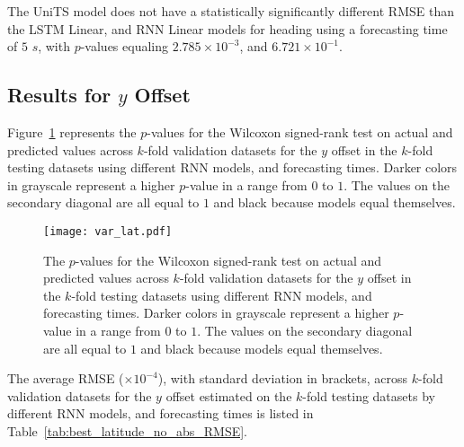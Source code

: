 The UniTS model does not have a statistically significantly different RMSE than the LSTM Linear, and RNN Linear models for heading using a forecasting time of $5$ $s$, with $p$-values equaling $2.785 \times 10^{-3}$, and $6.721 \times 10^{-1}$.

\subsection{Results for $y$ Offset}

Figure~\ref{fig:var_lat} represents the $p$-values for the Wilcoxon signed-rank test on actual and predicted values across $k$-fold validation datasets for the $y$ offset in the $k$-fold testing datasets using different RNN models, and forecasting times. Darker colors in grayscale represent a higher $p$-value in a range from $0$ to $1$. The values on the secondary diagonal are all equal to $1$ and black because models equal themselves.

\begin{figure}[!ht]
	\centering
	\texttt{[image: var\_lat.pdf]}
	\caption{The $p$-values for the Wilcoxon signed-rank test on actual and predicted values across $k$-fold validation datasets for the $y$ offset in the $k$-fold testing datasets using different RNN models, and forecasting times. Darker colors in grayscale represent a higher $p$-value in a range from $0$ to $1$. The values on the secondary diagonal are all equal to $1$ and black because models equal themselves.}
	\label{fig:var_lat}
\end{figure}

The average RMSE ($\times 10^{-4}$), with standard deviation in brackets, across $k$-fold validation datasets for the $y$ offset estimated on the $k$-fold testing datasets by different RNN models, and forecasting times is listed in Table~\ref{tab:best_latitude_no_abs_RMSE}.

